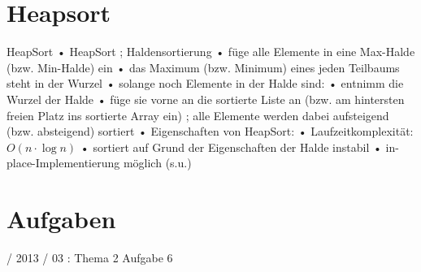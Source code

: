 \documentclass{lehramt-informatik-haupt}
\begin{document}

\chapter{Heapsort}

\begin{quellen}
\item \cite[Seite 45]{aud:fs:tafeluebung-11}
\item \cite{wiki:heapsort}
\item \cite[Seite 407-413 (PDF 424-429) 14.6.1
407
Sortieren
Sortieren mit Bäumen: HeapSort]{saake}
\end{quellen}

HeapSort
• HeapSort
; Haldensortierung
• füge alle Elemente in eine Max-Halde (bzw. Min-Halde) ein
• das Maximum (bzw. Minimum) eines jeden Teilbaums steht in der Wurzel
• solange noch Elemente in der Halde sind:
• entnimm die Wurzel der Halde
• füge sie vorne an die sortierte Liste an
(bzw. am hintersten freien Platz ins sortierte Array ein)
; alle Elemente werden dabei aufsteigend (bzw. absteigend) sortiert
• Eigenschaften von HeapSort:
• Laufzeitkomplexität:
$O( n \cdot \log n)$
• sortiert auf Grund der Eigenschaften der Halde instabil
• in-place-Implementierung möglich (s.u.)



\chapter{Aufgaben}

 / 2013 / 03 : Thema 2 Aufgabe 6

\literatur
\end{document}
